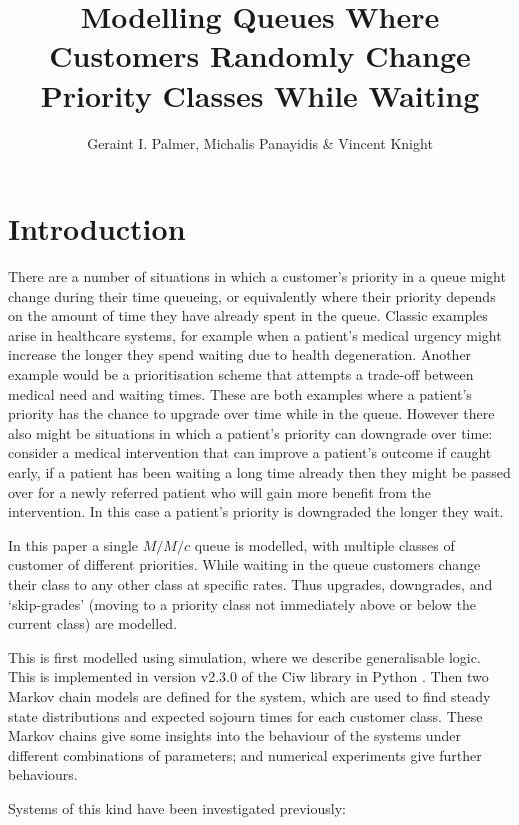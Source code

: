\documentclass{article}
\title{Modelling Queues Where Customers Randomly  Change Priority Classes While Waiting}
\author{Geraint I. Palmer, Michalis Panayidis \& Vincent Knight}
\date{}
\begin{document}
\maketitle

\section{Introduction}
There are a number of situations in which a customer's priority in a queue might
change during their time queueing, or equivalently where their priority depends
on the amount of time they have already spent in the queue.
Classic examples arise in healthcare systems, for example when a patient's
medical urgency might increase the longer they spend waiting due to health
degeneration. Another example would be a prioritisation scheme that attempts a
trade-off between medical need and waiting times.
These are both examples where a patient's priority has the chance to upgrade
over time while in the queue.
However there also might be situations in which a patient's priority can
downgrade over time: consider a medical intervention that can improve a
patient's outcome if caught early, if a patient has been waiting a long time
already then they might be passed over for a newly referred patient who will
gain more benefit from the intervention. In this case a patient's priority is
downgraded the longer they wait.

In this paper a single $M/M/c$ queue is modelled, with multiple classes of
customer of different priorities. While waiting in the queue customers change
their class to any other class at specific rates. Thus upgrades, downgrades, and
`skip-grades' (moving to a priority class not immediately above or below the
current class) are modelled.

This is first modelled using simulation, where we describe generalisable logic.
This is implemented in version v2.3.0 of the Ciw library in Python
\cite{palmer19}.
Then two Markov chain models are defined for the system, which are used to find
steady state distributions and expected sojourn times for each customer class.
These Markov chains give some insights into the behaviour of the systems under
different combinations of parameters; and numerical experiments give further
behaviours.

Systems of this kind have been investigated previously:
\end{document}
